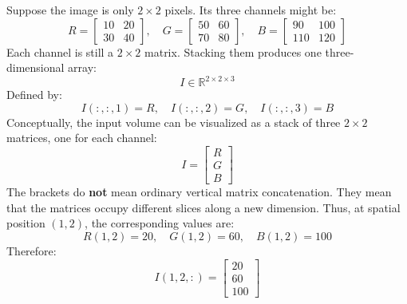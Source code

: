 \begin{examplebox}
    Suppose the image is only $2 \times 2$ pixels. Its three channels might be:
    \begin{equation*}
        R = \begin{bmatrix}
            10 & 20 \\
            30 & 40
        \end{bmatrix},
        \quad
        G = \begin{bmatrix}
            50 & 60 \\
            70 & 80
        \end{bmatrix},
        \quad
        B = \begin{bmatrix}
            90 & 100 \\
            110 & 120
        \end{bmatrix}
    \end{equation*}
    Each channel is still a $2 \times 2$ matrix. Stacking them produces one three-dimensional array:
    \begin{equation*}
        I \in \mathbb{R}^{2 \times 2 \times 3}
    \end{equation*}
    Defined by:
    \begin{equation*}
        I(:,:,1) = R, \quad I(:,:,2) = G, \quad I(:,:,3) = B
    \end{equation*}
    Conceptually, the input volume can be visualized as a stack of three $2 \times 2$ matrices, one for each channel:
    \begin{equation*}
        I = \begin{bmatrix}
            R \\
            G \\
            B
        \end{bmatrix}
    \end{equation*}
    The brackets do \textbf{not} mean ordinary vertical matrix concatenation. They mean that the matrices occupy different slices along a new dimension. Thus, at spatial position $(1, 2)$, the corresponding values are:
    \begin{equation*}
        R(1, 2) = 20, \quad G(1, 2) = 60, \quad B(1, 2) = 100
    \end{equation*}
    Therefore:
    \begin{equation*}
        I(1, 2, :) = \begin{bmatrix}
            20 \\
            60 \\
            100

\end{bmatrix}
\end{equation*}
\end{examplebox}
